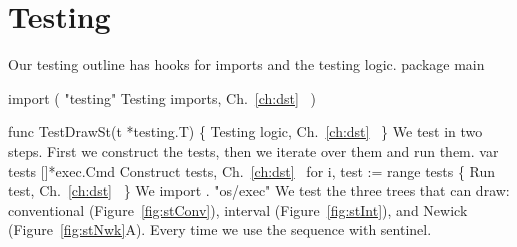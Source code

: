 \section*{Testing}
Our testing outline has hooks for imports and the testing logic.
\nwenddocs{}\endmoddef\nwstartdeflinemarkup\nwenddeflinemarkup
package main

import (
          "testing"
          \LA{}Testing imports, Ch.~\ref{ch:dst}~{\nwtagstyle{}}\RA{}
)

func TestDrawSt(t *testing.T) \{
          \LA{}Testing logic, Ch.~\ref{ch:dst}~{\nwtagstyle{}}\RA{}
\}
\nwendcode{}\nwdocspar
We test in two steps. First we construct the tests, then we iterate
over them and run them.
\nwenddocs{}\endmoddef\nwstartdeflinemarkup{}\nwenddeflinemarkup
var tests []*exec.Cmd
\LA{}Construct tests, Ch.~\ref{ch:dst}~{\nwtagstyle{}}\RA{}
for i, test := range tests \{
          \LA{}Run test, Ch.~\ref{ch:dst}~{\nwtagstyle{}}\RA{}
\}
\nwendcode{}\nwdocspar
We import .
\nwenddocs{}\endmoddef\nwstartdeflinemarkup{}\nwenddeflinemarkup
"os/exec"
\nwendcode{}\nwdocspar
We test the three trees that  can draw: conventional
(Figure~\ref{fig:stConv}), interval (Figure~\ref{fig:stInt}), and
Newick (Figure~\ref{fig:stNwk}A). Every time we use the sequence
 with sentinel.
\nwenddocs{}\endmoddef\nwstartdeflinemarkup{}\nwenddeflinemarkup
